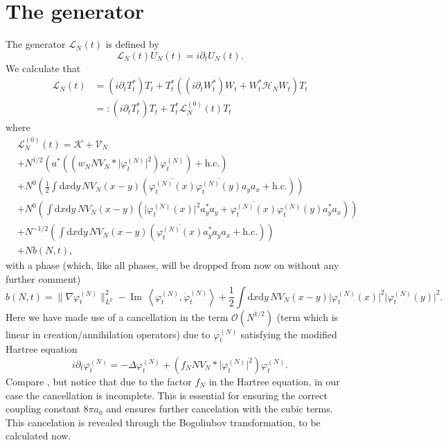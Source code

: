 \documentclass[11pt,a4paper]{scrartcl} %
\newcommand{\di}{\textrm{d}}		%
\newcommand{\Lcal}{\mathcal{L}}		%
\newcommand{\Kcal}{\mathcal{K}}		%
\newcommand{\Vcal}{\mathcal{V}}		%
\newcommand{\Hcal}{\mathcal{H}}		%
\newcommand{\Ocal}{\mathcal{O}}		%
\newcommand{\hc}{\mbox{h.c.}}		%
\newcommand{\scal}[2]{\left<#1,#2\right>} %
\newcommand{\cc}[1]{\overline{#1}}	%
\renewcommand{\Im}{\operatorname{Im}\,} 	%
\newcommand{\norm}[1]{\lVert#1\rVert}	%
\newcommand{\ph}{\varphi_t^{(N)}}	%
\newcommand{\phdot}{\dot{\varphi}_t^{(N)}}	%
\newcommand{\bd}{\begin{displaymath}}			%
\newcommand{\ed}{\end{displaymath}}
\begin{document}
\section{The generator}
The generator $\Lcal_N(t)$ is defined by
\bd
\Lcal_N(t) U_N(t) = i \partial_t U_N(t).
\ed
We calculate that
\begin{align*}
\Lcal_N(t) 	& = (i \partial_t T^*_t) T_t + T^*_t \left( (i \partial_t W^*_t) W_t + W^*_t \Hcal_N W_t \right) T_t \\
		& =: (i \partial_t T^*_t) T_t + T^*_t \Lcal^{(0)}_N(t) T_t
\end{align*}
where
\begin{align*}
& \Lcal^{(0)}_N(t) = \Kcal + \Vcal_N \\
		& + N^{1/2} \left(  a^*\left( (w_N N V_N \ast \lvert \ph \rvert^2)\ph \right) + \hc  \right) \\
		& + N^0	    \left(  \frac{1}{2}\int \di x \di y\, NV_N(x-y)\left( \cc{\ph(x)} \cc{\ph(y)} a_y a_x + \hc \right) \right) \\
		& + N^0	    \left(  \int \di x \di y\, NV_N(x-y)\left( \lvert \ph(x) \rvert^2 a^*_y a_y + \cc{\ph(x)} \ph(y) a^*_y a_x \right) \right) \\
		& + N^{-1/2}\left(  \int \di x \di y\, NV_N(x-y) \left( \cc{\ph(x)} a^*_y a_y a_x + \hc \right)  \right) \\
		& + N b(N,t),
\end{align*}
with a phase (which, like all phases, will be dropped from now on without any further comment)
\bd
b(N,t) = \norm{\nabla \ph}_{L^2}^2 - \Im \scal{\ph}{\phdot} + \frac{1}{2}\int \di x \di y\, NV_N(x-y) \lvert \ph(x)\rvert^2 \lvert \ph(y) \rvert^2.
\ed
Here we have made use of a cancellation in the term $\Ocal({N^{1/2}})$ (term which is linear in creation/annihilation operators) due to $\ph$ satisfying the modified Hartree equation
\bd
i\partial_t \ph = -\Delta \ph + \left(f_N N V_N \ast \lvert \ph \rvert^2 \right) \ph.
\ed
Compare \cite{RS2009}, but notice that due to the factor $f_N$ in the Hartree equation, in our case the cancellation is incomplete. This is essential for ensuring the correct coupling constant $8\pi a_0$ and ensures further cancelation with the cubic terms. This cancelation is revealed through the Bogoliubov transformation, to be calculated now.
\end{document}
